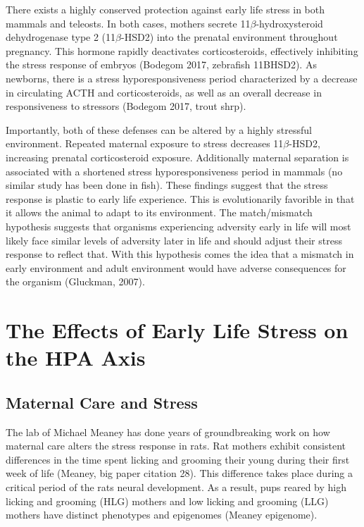 \documentclass[12pt,twoside]{reedthesis}
\begin{document}
There exists a highly conserved protection against early life stress in both
mammals and teleosts. In both cases, mothers secrete 11$\beta$-hydroxysteroid
dehydrogenase type 2 (11$\beta$-HSD2) into the prenatal environment throughout
pregnancy. This hormone rapidly deactivates corticosteroids, effectively
inhibiting the stress response of embryos (Bodegom 2017, zebrafish 11BHSD2). As
newborns, there is a stress hyporesponsiveness period characterized by a
decrease in circulating ACTH and corticosteroids, as well as an overall decrease
in responsiveness to stressors (Bodegom 2017, trout shrp).

Importantly, both of these defenses can be altered by a highly stressful
environment. Repeated maternal exposure to stress decreases 11$\beta$-HSD2,
increasing prenatal corticosteroid exposure. Additionally maternal separation is
associated with a shortened stress hyporesponsiveness period in mammals (no
similar study has been done in fish). These findings suggest that the stress
response is plastic to early life experience. This is
evolutionarily favorible in that it allows the animal to adapt to its
environment. The match/mismatch hypothesis suggests that organisms experiencing
adversity early in life will most likely face similar levels of adversity later
in life and should adjust their stress response to reflect that. With this
hypothesis comes the idea that a mismatch in early environment and adult
environment would have adverse consequences for the organism (Gluckman, 2007). 

\section{The Effects of Early Life Stress on the HPA Axis}

\subsection{Maternal Care and Stress}
The lab of Michael Meaney has done years of groundbreaking work on how maternal
care alters the stress response in rats.  Rat mothers exhibit consistent differences in the time spent licking and grooming
their young during their first week of life (Meaney, big paper citation 28). This difference takes place during a critical period
of the rats neural development. As a result, pups reared by high licking and grooming
(HLG) mothers and low licking and grooming (LLG) mothers have distinct
phenotypes and epigenomes (Meaney epigenome).
\end{document}
